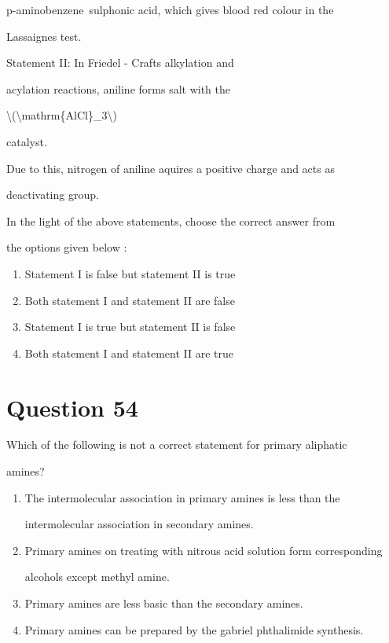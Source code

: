 \documentclass{article}
\begin{document}
p-aminobenzene~sulphonic acid, which gives blood red colour in the

\textquotesingle Lassaigne\textquotesingle s test\textquotesingle.\\

{Statement II: In Friedel - Craft\textquotesingle s alkylation and

acylation reactions, aniline forms salt with the

\textbackslash(\textbackslash mathrm\{AlCl\}\_3\textbackslash)

catalyst.\\

}{Due to this, nitrogen of aniline aquires a positive charge and acts as

deactivating group.\\

}{In the light of the above statements, choose the correct answer from

the options given below :}


\begin{enumerate}[label=(\alph*)]
\item Statement I is false but statement II is true


\item Both statement I and statement II are false


\item Statement I is true but statement II is false


\item Both statement I and statement II are true


\end{enumerate}
\newpage
\section*{Question 54}
Which of the following is not a correct statement for primary aliphatic

amines?


\begin{enumerate}[label=(\alph*)]
\item The intermolecular association in primary amines is less than the

intermolecular association in secondary amines.


\item Primary amines on treating with nitrous acid solution form corresponding

alcohols except methyl amine.


\item Primary amines are less basic than the secondary amines.


\item Primary amines can be prepared by the gabriel phthalimide synthesis.


\end{enumerate}
\newpage
\end{document}
